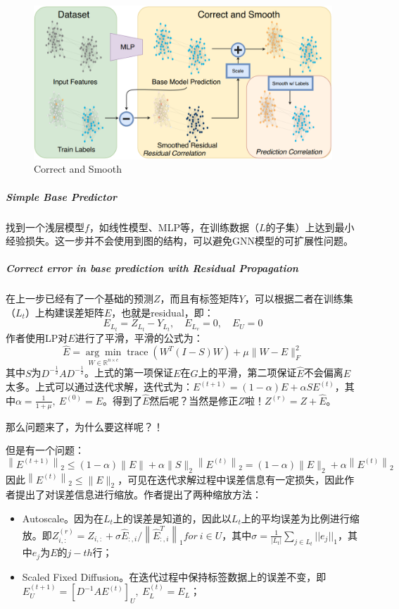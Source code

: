 \begin{figure}[h]
	\centering
	\includegraphics[width=.8\textwidth]{pics/C&S.png}
	\caption{Correct and Smooth}
	\label{fig:C&S}
\end{figure}

\subparagraph{Simple Base Predictor}
找到一个浅层模型$f$，如线性模型、MLP等，在训练数据（$L$的子集）上达到最小经验损失。这一步并不会使用到图的结构，可以避免GNN模型的可扩展性问题。

\subparagraph{Correct error in base prediction with Residual Propagation}
在上一步已经有了一个基础的预测$Z$，而且有标签矩阵$Y$，可以根据二者在训练集（$L_t$）上构建误差矩阵$E$，也就是residual，即：
$$
E_{L_t} = Z_{L_t} - Y_{L_t},\quad E_{L_v} = 0,\quad E_{U} = 0
$$
作者使用LP对$E$进行了平滑，平滑的公式为：
$$
\hat{E}=\underset{W \in \mathbb{R}^{n \times c}}{\arg \min } \operatorname{trace}\left(W^{T}(I-S) W\right)+\mu\|W-E\|_{F}^{2}
$$
其中$S$为$D^{-\frac{1}{2}}AD^{-\frac{1}{2}}$。上式的第一项保证$E$在$G$上的平滑，第二项保证$\hat{E}$不会偏离$E$太多。上式可以通过迭代求解，迭代式为：$E^{(t+1)} = (1-\alpha)E + \alpha SE^{(t)}$，其中$\alpha = \frac{1}{1+\mu},\: E^{(0)} = E$。得到了$\hat{E}$然后呢？当然是修正$Z$啦！$Z^{(r)} = Z + \hat{E}$。

那么问题来了，为什么要这样呢？！ 

但是有一个问题：
$$
\left\|E^{(t+1)}\right\|_{2} \leq(1-\alpha)\|E\|+\alpha\|S\|_{2}\left\|E^{(t)}\right\|_{2}=(1-\alpha)\|E\|_{2}+\alpha\left\|E^{(t)}\right\|_{2}
$$
因此$\left\|E^{(t)}\right\|_{2} \leq\|E\|_{2}$，可见在迭代求解过程中误差信息有一定损失，因此作者提出了对误差信息进行缩放。作者提出了两种缩放方法：
\begin{itemize}
	\item Autoscale。因为在$L_t$上的误差是知道的，因此以$L_t$上的平均误差为比例进行缩放。即$Z_{i,:}^{(r)}=Z_{i,:}+\sigma \hat{E}_{:, i} /\left\|\hat{E}_{:, i}^{T}\right\|_{1} for\:i \in U$，其中$\sigma = \frac{1}{|L_t|}\sum_{j \in L_t} ||e_j||_1$，其中$e_j$为$E$的$j-th$行；
	 
	\item Scaled Fixed Diffusion。在迭代过程中保持标签数据上的误差不变，即$E_U^{(t+1)} = [D^{-1}AE^{(t)}]_U,\: E_L^{(t)} = E_L$；
\end{itemize}


